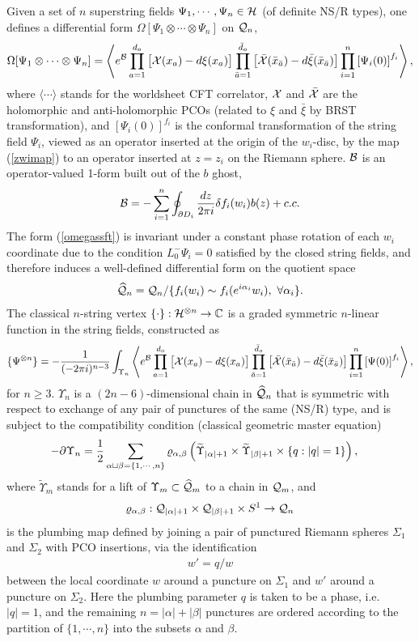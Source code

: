 \documentclass[12pt]{article}
\def\ie{\begin{equation}\begin{aligned}}
\def\fe{\end{aligned}\end{equation}}
\numberwithin{equation}{section}
\newcommand{\A}{{\alpha}}
\begin{document}
Given a set of $n$ superstring fields $\Psi_1,\cdots,\Psi_n\in{\cal H}$ (of definite NS/R types), one defines a differential form $\Omega[\Psi_1\otimes\cdots\otimes \Psi_n]$ on ${\cal Q}_{n}$,
\ie\label{omegassft}
\Omega[\Psi_1\otimes\cdots\otimes \Psi_n] = \left\langle e^{\cal B} \prod_{a=1}^{d_o} \big[ {\cal X}(x_a) - d\xi(x_a) \big] \prod_{\bar a=1}^{\bar d_o} \big[ \bar{\cal X}(\bar {x}_{\bar a}) - d\bar\xi(\bar{x}_{\bar a})\big] \prod_{i=1}^n \left[ \Psi_i(0) \right]^{f_i} \right\rangle,
\fe
where $\langle\cdots\rangle$ stands for the worldsheet CFT correlator, ${\cal X}$ and $\bar{\cal X}$ are the holomorphic and anti-holomorphic PCOs (related to $\xi$ and $\bar\xi$ by BRST transformation), and $\left[ \Psi_i(0) \right]^{f_i}$ is the conformal transformation of the string field $\Psi_i$, viewed as an operator inserted at the origin of the $w_i$-disc, by the
map (\ref{zwimap}) to an operator inserted at $z = z_i$ on the Riemann sphere. ${\cal B}$ is an operator-valued 1-form built out of the $b$ ghost,
\ie
{\cal B} = -\sum_{i=1}^n \oint_{\partial D_i} {dz\over 2\pi i} \delta f_i(w_i) b(z) + c.c.
\fe
The form (\ref{omegassft}) is invariant under a constant phase rotation of each $w_i$ coordinate due to the condition $L_0^- \Psi_i =0$ satisfied by the closed string fields, and therefore induces a well-defined differential form on the quotient space
\ie
\widehat{\cal Q}_{n} = {\cal Q}_{n}/\{f_i(w_i) \sim f_i(e^{i\A_i} w_i), ~\forall \A_i\}.
\fe
The classical $n$-string vertex $\{\cdot\}:{\cal H}^{\otimes n}\to \mathbb{C}$ is a graded symmetric $n$-linear function in the string fields, constructed as
\ie\label{supersftvert}
\{\Psi^{\otimes n}\} = - {1\over (-2\pi i)^{n-3}} \int_{\Upsilon_{n}}  \left\langle e^{\cal B} \prod_{a=1}^{d_o} \big[ {\cal X}(x_a) - d\xi(x_a) \big] \prod_{\bar a=1}^{\bar d_o} \big[ \bar{\cal X}(\bar x_{\bar a}) - d\bar\xi(\bar x_{\bar a})\big] \prod_{i=1}^n \left[ \Psi(0) \right]^{f_i} \right\rangle,
\fe
for $n\geq 3$.
$\Upsilon_{n}$ is a $(2n-6)$-dimensional chain in $\widehat{\cal Q}_{n}$ that is symmetric with respect to exchange of any pair of punctures of the same (NS/R) type, and is subject to the compatibility condition (classical geometric master equation)
\ie\label{geommassuper}
- \partial \Upsilon_{n} &= {1\over 2} \sum_{\A\sqcup\beta = \{1,\cdots,n\}} \varrho_{\A,\beta} \left( \widetilde\Upsilon_{|\A|+1}\times \widetilde\Upsilon_{|\beta|+1}\times \{q:|q|=1\} \right),
\fe
where $\widetilde\Upsilon_m$ stands for a lift of $\Upsilon_m\subset\widehat{\cal Q}_m$ to a chain in ${\cal Q}_m$, and
\ie\label{plumbingmapab}
\varrho_{\A,\beta}: {\cal Q}_{|\A|+1} \times  {\cal Q}_{|\beta|+1} \times S^1  \to  {\cal Q}_{n}
\fe
is the plumbing map defined by joining a pair of punctured Riemann spheres $\Sigma_1$ and $\Sigma_2$ with PCO insertions, via the identification
\ie
w' = q/w
\fe
between the local coordinate $w$ around a puncture on $\Sigma_1$ and $w'$ around a puncture on $\Sigma_2$. Here the plumbing parameter $q$ is taken to be a phase, i.e. $|q|=1$, and the remaining $n=|\A|+|\beta|$ punctures are ordered according to the partition of $\{1,\cdots,n\}$ into the subsets $\A$ and $\beta$.
\end{document}
